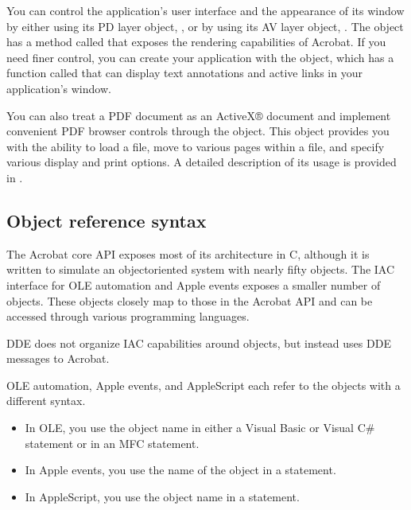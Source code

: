 \documentclass[letterpaper,12pt,english,openany,oneside]{sphinxmanual}
\begin{document}
You can control the application’s user interface and the appearance of its window by either using its PD layer object, , or by using its AV layer object, . The  object has a method called  that exposes the rendering capabilities of Acrobat. If you need finer control, you can create your application with the  object, which has a function called  that can display text annotations and active links in your application’s window.

You can also treat a PDF document as an ActiveX® document and implement convenient PDF browser controls through the  object. This object provides you with the ability to load a file, move to various pages within a file, and specify various display and print options. A detailed description of its usage is provided in .


\subsection{Object reference syntax}
\label{\detokenize{index:object-reference-syntax}}
The Acrobat core API exposes most of its architecture in C, although it is written to simulate an object\sphinxhyphen{}oriented system with nearly fifty objects. The IAC interface for OLE automation and Apple events exposes a smaller number of objects. These objects closely map to those in the Acrobat API and can be accessed through various programming languages.

DDE does not organize IAC capabilities around objects, but instead uses DDE messages to Acrobat.

OLE automation, Apple events, and AppleScript each refer to the objects with a different syntax.
\begin{itemize}
\item {} 
In OLE, you use the object name in either a Visual Basic or Visual C\#  statement or in an MFC  statement.

\item {} 
In Apple events, you use the name of the object in a  statement.

\item {} 
In AppleScript, you use the object name in a  statement.

\end{itemize}
\end{document}
